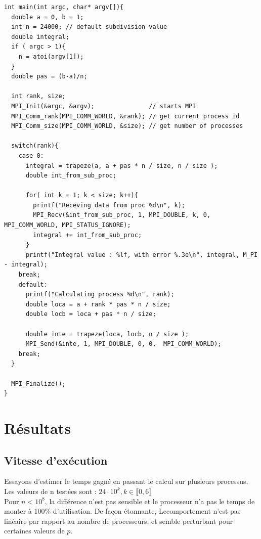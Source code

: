 \documentclass{article}
\begin{document}
\begin{lstlisting}[style=ccode, morekeywords={f, MPI_Recv, MPI_Send, trapeze_sequential}]
int main(int argc, char* argv[]){
  double a = 0, b = 1;
  int n = 24000; // default subdivision value
  double integral;
  if ( argc > 1){
    n = atoi(argv[1]);
  }
  double pas = (b-a)/n;

  int rank, size;
  MPI_Init(&argc, &argv);               // starts MPI
  MPI_Comm_rank(MPI_COMM_WORLD, &rank); // get current process id
  MPI_Comm_size(MPI_COMM_WORLD, &size); // get number of processes

  switch(rank){
    case 0:
      integral = trapeze(a, a + pas * n / size, n / size );
      double int_from_sub_proc;

      for( int k = 1; k < size; k++){
        printf("Receving data from proc %d\n", k);
        MPI_Recv(&int_from_sub_proc, 1, MPI_DOUBLE, k, 0, MPI_COMM_WORLD, MPI_STATUS_IGNORE);
        integral += int_from_sub_proc;
      }
      printf("Integral value : %lf, with error %.3e\n", integral, M_PI - integral);
    break;
    default:
      printf("Calculating process %d\n", rank);
      double loca = a + rank * pas * n / size;
      double locb = loca + pas * n / size;

      double inte = trapeze(loca, locb, n / size );
      MPI_Send(&inte, 1, MPI_DOUBLE, 0, 0,  MPI_COMM_WORLD);
    break;
  }

  MPI_Finalize();
}
\end{lstlisting}

\newpage

\section{Résultats}

\subsection{Vitesse d'exécution}

Essayons d'estimer le temps gagné en passant le calcul sur plusieurs processus.\\

Les valeurs de n testées sont : $24\cdot10^k , k \in \llbracket 0,6\rrbracket$\\

Pour $n<10^8$, la différence n'est pas sensible et le processeur n'a pas le temps de monter à 100\% d'utilisation.
De façon étonnante, Lecomportement n'est pas linéaire par rapport au nombre de processeurs, et semble perturbant pour certaines valeurs de $p$.\\
\end{document}
